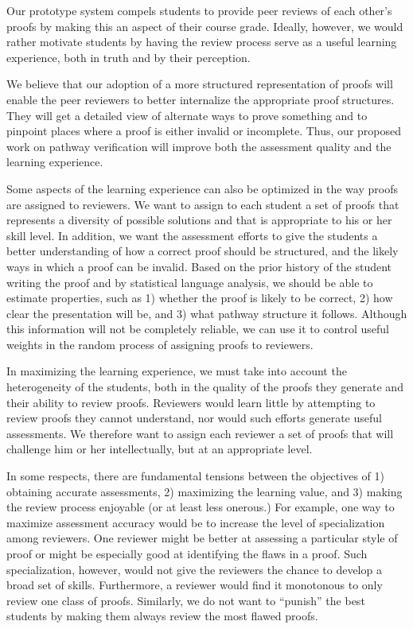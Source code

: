 \documentclass[12pt]{article}
\begin{document}
Our prototype system compels students to provide peer reviews of each
other's proofs by making this an aspect of their course grade.
Ideally, however, we would
rather motivate students by having the review process serve as a useful
learning experience, both in truth and by their perception.

We believe that our adoption of a more structured representation of
proofs will enable the peer reviewers to better internalize the
appropriate proof structures.  They will get a detailed view of
alternate ways to prove something and to pinpoint places where a proof
is either invalid or incomplete.  Thus, our proposed work on pathway
verification will improve both the assessment quality and the learning
experience. 

Some aspects of the learning experience can also be optimized in the way
proofs are assigned to reviewers.  We want to assign to each student
a set of proofs that represents a diversity of possible solutions and
that is appropriate to his or her skill level.  In addition, we want
the assessment efforts to give the students a better understanding of
how a correct proof should be structured, and the likely ways in which
a proof can be invalid.
Based on the
prior history of the student writing the proof and by statistical
language analysis, we should be able to estimate properties, such as
1) whether the proof is likely to be correct, 2) how clear the presentation
will be, and 3) what pathway structure it follows.  Although this
information will not be completely reliable, we can use it to control
useful weights in the random process of assigning proofs to reviewers.

In maximizing the learning experience, we must take into account the
heterogeneity of the students, both in the quality of the proofs they
generate and their ability to review proofs.  Reviewers would learn
little by attempting to review proofs they cannot understand, nor
would such efforts generate useful assessments.  We therefore want to
assign each reviewer a set of proofs that will challenge him or her
intellectually, but at an appropriate level.

In some respects, there are fundamental tensions between the
objectives of 1) obtaining accurate assessments, 2) maximizing the
learning value, and 3) making the review process enjoyable (or at
least less onerous.)  For example, one way to maximize assessment
accuracy would be to increase the level of specialization among
reviewers.  One reviewer might be better at assessing a particular
style of proof or might be especially good at identifying the flaws in
a proof.  Such specialization, however, would not give the reviewers
the chance to develop a broad set of skills.  Furthermore, a reviewer
would find it monotonous to only review one class of proofs.
Similarly, we do not want to ``punish'' the best students by making
them always review the most flawed proofs.
\end{document}
